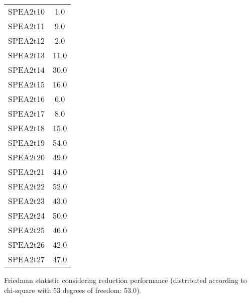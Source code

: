 \documentclass{article}
\begin{document}
\begin{table}[!htp]
\begin{tabular}{c|c}
SPEA2t10&1.0\\
SPEA2t11&9.0\\
SPEA2t12&2.0\\
SPEA2t13&11.0\\
SPEA2t14&30.0\\
SPEA2t15&16.0\\
SPEA2t16&6.0\\
SPEA2t17&8.0\\
SPEA2t18&15.0\\
SPEA2t19&54.0\\
SPEA2t20&49.0\\
SPEA2t21&44.0\\
SPEA2t22&52.0\\
SPEA2t23&43.0\\
SPEA2t24&50.0\\
SPEA2t25&46.0\\
SPEA2t26&42.0\\
SPEA2t27&47.0\\
\end{tabular}
\end{table}


Friedman statistic considering reduction performance (distributed according to chi-square with 53 degrees of freedom: 53.0).
\end{document}
